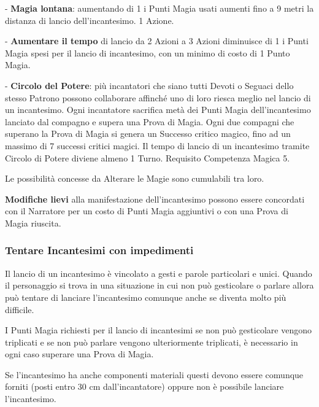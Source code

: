 \begin{multicols}{2}
- \textbf{Magia lontana}: aumentando di 1 i Punti Magia usati aumenti fino a 9 metri la distanza di lancio dell'incantesimo. 1 Azione.

- \textbf{Aumentare il tempo} di lancio da 2 Azioni a 3 Azioni diminuisce di 1 i Punti Magia spesi per il lancio di incantesimo, con un minimo di costo di 1 Punto Magia.

- \textbf{Circolo del Potere}: più incantatori che siano tutti Devoti o Seguaci dello stesso Patrono possono collaborare affinché uno di loro riesca meglio nel lancio di un incantesimo.
Ogni incantatore sacrifica metà dei Punti Magia dell'incantesimo lanciato dal compagno e supera una Prova di Magia. Ogni due compagni che superano la Prova di Magia si genera un Successo critico magico, fino ad un massimo di 7 successi critici magici. Il tempo di lancio di un incantesimo tramite Circolo di Potere diviene almeno 1 Turno. Requisito Competenza Magica 5.

\medskip

Le possibilità concesse da Alterare le Magie sono cumulabili tra loro.

\medskip

\textbf{Modifiche lievi}  alla manifestazione dell'incantesimo possono essere concordati con il Narratore per un costo di Punti Magia aggiuntivi o con una Prova di Magia riuscita.

\subsubsection{Tentare Incantesimi con impedimenti} \label{magieconimpedimenti}\hypertarget{magieconimpedimenti}{}

Il lancio di un incantesimo è vincolato a gesti e parole particolari e unici. Quando il personaggio si trova in una situazione in cui non può gesticolare o parlare allora può tentare di lanciare l'incantesimo comunque anche se diventa molto più difficile.

I Punti Magia richiesti per il lancio di incantesimi se non può gesticolare vengono triplicati e se non può parlare vengono ulteriormente triplicati, è necessario in ogni caso superare una Prova di Magia.

Se l'incantesimo ha anche componenti materiali questi devono essere comunque forniti (posti entro 30 cm dall'incantatore) oppure non è possibile lanciare l'incantesimo.


\end{multicols}
